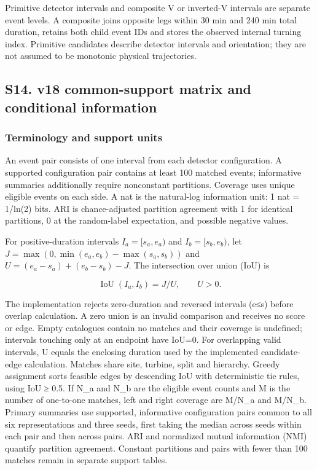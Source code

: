 \documentclass[a4paper,11pt]{article}
\begin{document}
Primitive detector intervals and composite V or inverted-V intervals are separate event levels. A composite joins opposite legs within 30 min and 240 min total duration, retains both child event IDs and stores the observed internal turning index. Primitive candidates describe detector intervals and orientation; they are not assumed to be monotonic physical trajectories.

\subsection{S14. v18 common-support matrix and conditional information}\label{s14.-v18-common-support-matrix-and-conditional-information}

\subsubsection{Terminology and support units}\label{terminology-and-support-units}

An event pair consists of one interval from each detector configuration. A supported configuration pair contains at least 100 matched events; informative summaries additionally require nonconstant partitions. Coverage uses unique eligible events on each side. A nat is the natural-log information unit: 1 nat = 1/ln(2) bits. ARI is chance-adjusted partition agreement with 1 for identical partitions, 0 at the random-label expectation, and possible negative values.

For positive-duration intervals \(I_a=[s_a,e_a)\) and \(I_b=[s_b,e_b)\), let \(J=\max(0,\min(e_a,e_b)-\max(s_a,s_b))\) and \(U=(e_a-s_a)+(e_b-s_b)-J\). The intersection over union (IoU) is

\[
\operatorname{IoU}(I_a,I_b)=J/U,\qquad U>0.
\]

The implementation rejects zero-duration and reversed intervals (e≤s) before overlap calculation. A zero union is an invalid comparison and receives no score or edge. Empty catalogues contain no matches and their coverage is undefined; intervals touching only at an endpoint have IoU=0. For overlapping valid intervals, U equals the enclosing duration used by the implemented candidate-edge calculation. Matches share site, turbine, split and hierarchy. Greedy assignment sorts feasible edges by descending IoU with deterministic tie rules, using IoU ≥ 0.5. If N\_a and N\_b are the eligible event counts and M is the number of one-to-one matches, left and right coverage are M/N\_a and M/N\_b. Primary summaries use supported, informative configuration pairs common to all six representations and three seeds, first taking the median across seeds within each pair and then across pairs. ARI \citep{hubert1985} and normalized mutual information (NMI) quantify partition agreement. Constant partitions and pairs with fewer than 100 matches remain in separate support tables.
\end{document}
